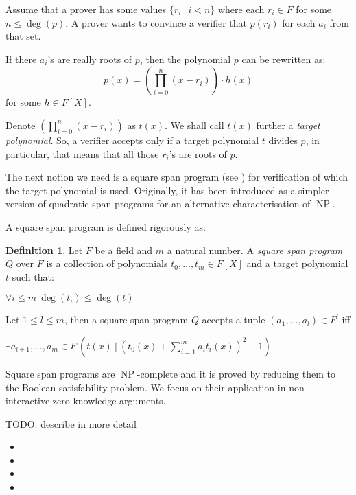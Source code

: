 \documentclass{article}
\theoremstyle{definition}
\newtheorem{definition}{Definition}[section]
\theoremstyle{remark}
\begin{document}
Assume that a prover has some values $\{ r_i \: | \: i < n\}$ where each $r_i \in F$ for some $n \leq \deg(p)$.
A prover wants to convince a verifier that $p(r_i)$ for each $a_i$ from that set.

If there $a_i$'s are really roots of $p$, then the polynomial $p$ can be rewritten as:
\begin{equation}
p(x) = (\prod_{i = 0}^n (x - r_i)) \cdot h(x)
\end{equation}
for some $h \in F[X]$.

Denote $(\prod_{i = 0}^n (x - r_i))$ as $t(x)$. We shall call $t(x)$ further a \emph{target polynomial}. So, a verifier accepts only if a target polynomial $t$ divides $p$, in particular, that means that all those $r_i$'s are roots of $p$.

The next notion we need is a square span program (see \cite{danezis2014square}) for verification of which the target polynomial is used. Originally, it has been introduced as a simpler version of quadratic span programs for an alternative characterisation of $\operatorname{NP}$.

A square span program is defined rigorously as:
\begin{definition}
Let $F$ be a field and $m$ a natural number. A \emph{square span program} $Q$ over $F$ is a collection of polynomials $t_0, \dots, t_m \in F[X]$ and a target polynomial $t$ such that:
\begin{center}
$\forall i \leq m \: \deg(t_i) \leq \deg(t)$
\end{center}

Let $1 \leq l \leq m$, then a square span program $Q$ accepts a tuple $(a_1, \dots, a_l) \in F^l$ iff

\begin{center}
$\exists a_{l + 1}, \dots, a_m \in F \: \left( t(x) \: | \: \left( t_0(x) + \sum \limits_{i = 1}^m a_i t_i(x) \right)^2 - 1 \right)$
\end{center}
\end{definition}

Square span programs are $\operatorname{NP}$-complete and it is proved by reducing them to the Boolean satisfability problem. We focus on their application in non-interactive zero-knowledge arguments.

TODO: describe in more detail

\begin{itemize}
\item
\item
\item
\item
\end{itemize}
\end{document}
